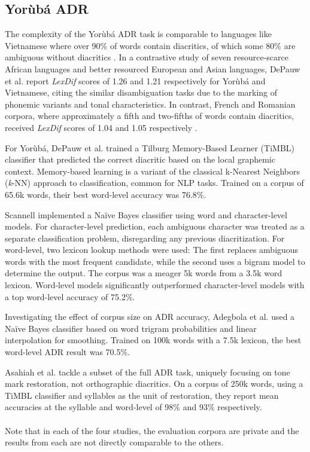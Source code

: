 \documentclass[a4paper]{article}
\begin{document}
\subsection{Yor{\`u}b{\'a} ADR}

The complexity of the Yor{\`u}b{\'a} ADR task is comparable to languages like Vietnamese where over 90\% of words contain diacritics, of which some 80\% are ambiguous without diacritics \cite{pham2017use, do2013machine}. In a contrastive study of seven resource-scarce African languages and better resourced European and Asian languages, DePauw et al. \cite{de2007automatic} report \emph{LexDif} scores of 1.26 and 1.21 respectively for Yor{\`u}b{\'a} and Vietnamese, citing the similar disambiguation tasks due to the marking of phonemic variants and tonal characteristics. In contrast, French and Romanian corpora, where approximately a fifth and two-fifths of words contain diacritics, received \emph{LexDif} scores of 1.04 and 1.05 respectively \cite{simard1998automatic}. 

For Yor{\`u}b{\'a},  DePauw et al. trained a Tilburg Memory-Based Learner (TiMBL) classifier that predicted the correct diacritic based on the local graphemic context. Memory-based learning is a variant of the classical k-Nearest Neighbors (\emph{k}-NN) approach to classification, common for NLP tasks. Trained on a corpus of 65.6k words, their best word-level accuracy was 76.8\%. 

Scannell \cite{scannell2011statistical} implemented a Na{\"i}ve Bayes classifier using word and character-level models. For character-level prediction, each ambiguous character was treated as a separate classification problem, disregarding any previous diacritization. For word-level, two lexicon lookup methods were used: The first replaces ambiguous words with the most frequent candidate, while the second uses a bigram model to determine the output. The corpus was a meager 5k words from a 3.5k word lexicon. Word-level models significantly outperformed character-level models with a top word-level accuracy of 75.2\%.

Investigating the effect of corpus size on ADR accuracy, Adegbola et al. \cite{adegbola2012quantifying} used a Na{\"i}ve Bayes classifier based on word trigram probabilities and linear interpolation for smoothing. Trained on 100k words with a 7.5k lexicon, the best word-level ADR result was 70.5\%.

Asahiah et al. \cite{asahiah2017restoring} tackle a subset of the full ADR task, uniquely focusing on tone mark restoration, not orthographic diacritics. On a corpus of 250k words, using a TiMBL classifier and syllables as the unit of restoration, they report mean accuracies at the syllable and word-level of 98\% and 93\% respectively.
\\
\\
Note that in each of the four studies, the evaluation corpora are private and the results from each are not directly comparable to the others.
\end{document}
